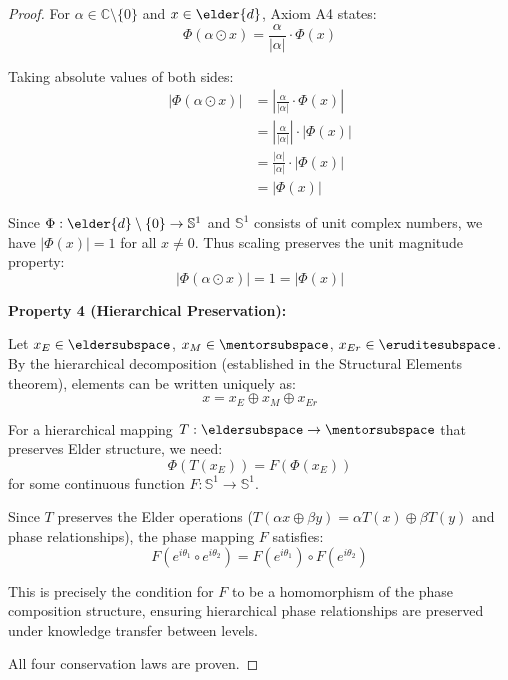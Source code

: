 \begin{proof}
For $\alpha \in \mathbb{C} \setminus \{0\}$ and $x \in \elder{d}$, Axiom A4 states:
$$\Phi(\alpha \odot x) = \frac{\alpha}{|\alpha|} \cdot \Phi(x)$$

Taking absolute values of both sides:
\begin{align}
|\Phi(\alpha \odot x)| &= \left|\frac{\alpha}{|\alpha|} \cdot \Phi(x)\right| \\
&= \left|\frac{\alpha}{|\alpha|}\right| \cdot |\Phi(x)| \\
&= \frac{|\alpha|}{|\alpha|} \cdot |\Phi(x)| \\
&= |\Phi(x)|
\end{align}

Since $\Phi: \elder{d} \setminus \{0\} \rightarrow \mathbb{S}^1$ and $\mathbb{S}^1$ consists of unit complex numbers, we have $|\Phi(x)| = 1$ for all $x \neq 0$. Thus scaling preserves the unit magnitude property:
$$|\Phi(\alpha \odot x)| = 1 = |\Phi(x)|$$

\textbf{Property 4 (Hierarchical Preservation):}

Let $x_E \in \eldersubspace$, $x_M \in \mentorsubspace$, $x_{Er} \in \eruditesubspace$. By the hierarchical decomposition (established in the Structural Elements theorem), elements can be written uniquely as:
$$x = x_E \oplus x_M \oplus x_{Er}$$

For a hierarchical mapping $T: \eldersubspace \rightarrow \mentorsubspace$ that preserves Elder structure, we need:
$$\Phi(T(x_E)) = F(\Phi(x_E))$$
for some continuous function $F: \mathbb{S}^1 \rightarrow \mathbb{S}^1$.

Since $T$ preserves the Elder operations ($T(\alpha x \oplus \beta y) = \alpha T(x) \oplus \beta T(y)$ and phase relationships), the phase mapping $F$ satisfies:
$$F(e^{i\theta_1} \circ e^{i\theta_2}) = F(e^{i\theta_1}) \circ F(e^{i\theta_2})$$

This is precisely the condition for $F$ to be a homomorphism of the phase composition structure, ensuring hierarchical phase relationships are preserved under knowledge transfer between levels.

All four conservation laws are proven.
\end{proof}

